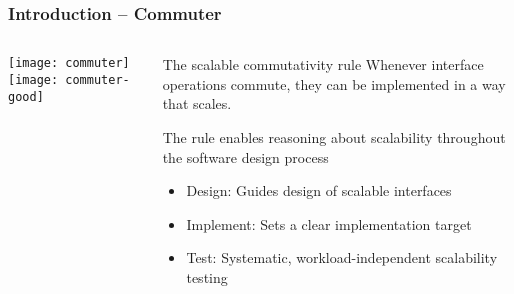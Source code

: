 \begin{frame}[plain]
	\frametitle{Introduction -- Commuter}
	
	
	\begin{columns}
		
		\begin{column}{.3\textwidth}	
			
			\texttt{[image: commuter]}
			\texttt{[image: commuter-good]}
			
		\end{column}
		
		\begin{column}{.7\textwidth}
			
			
			\begin{block}{The scalable commutativity rule}
				Whenever interface operations commute,
				they can be implemented in a way that scales.
				
				
			\end{block}
			The rule enables reasoning about scalability
			throughout the software design process
			
			
			\begin{itemize}
				\item  Design:			Guides design of scalable interfaces
				
				
				
				\item Implement:				Sets a clear implementation target
				
				
				
				
				\item  Test:				Systematic, workload-independent scalability testing
				
				
			\end{itemize}

			
		\end{column}
		
	\end{columns}
	
	
\end{frame}	


